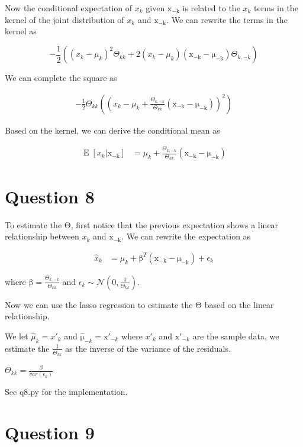 \documentclass{article}
\newcommand{\vect}[1]{\boldsymbol{\mathrm{#1}}}
\DeclareMathOperator{\E}{E}
\begin{document}
Now the conditional expectation of \(x_k\) given \(\vect{x_{-k}}\) is related to the \(x_k\) terms in the kernel of the joint distribution of \(x_k\) and \(\vect{x_{-k}}\). We can rewrite the terms in the kernel as

\[-\frac{1}{2} \left( {(x_k - \mu_k)^2}{\Theta_{kk}} + 2 {(x_k - \mu_k)(\vect{x_{-k}} - \vect{\mu_{-k}})}{\Theta_{k,-k}}   \right)\]

We can complete the square as

\begin{align*}
  -\frac{1}{2} \Theta_{kk}\left( (x_k - \mu_k + \frac{\Theta_{k,-k}}{\Theta_{kk}}(\vect{x_{-k}} - \vect{\mu_{-k}}))^2  \right)
\end{align*}

Based on the kernel, we can derive the conditional mean as 

\begin{align*}
  \E[x_k | \vect{x_{-k}}] &= \mu_k + \frac{\Theta_{k,-k}}{\Theta_{kk}}(\vect{x_{-k}} - \vect{\mu_{-k}})
\end{align*}

\section*{Question 8}
To estimate the \(\vect \Theta\), first notice that the previous expectation shows a linear relationship between \(x_k\) and \(\vect{x_{-k}}\). We can rewrite the expectation as

\begin{align*}
  \hat x_k &= \mu_k + \vect \beta^T(\vect{x_{-k}} - \vect{\mu_{-k}}) + \epsilon_k
\end{align*}

where \(\vect \beta = \frac{\Theta_{k,-k}}{\Theta_{kk}}\) and \(\epsilon_k \sim \mathcal{N}(0, \frac{1}{\Theta_{kk}})\).

Now we can use the lasso regression to estimate the \(\vect \Theta\) based on the linear relationship.

We let \(\hat \mu_k = x'_k\) and \(\hat{\vect{\mu}}_{-k} = \vect x'_{-k}\) where \(x'_k\) and \(\vect x'_{-k}\) are the sample data, we estimate the \(\frac{1}{\Theta_{kk}}\) as the inverse of the variance of the residuals.

\(\Theta_{kk} = \frac{\beta}{var(\epsilon_k)}\)

See q8.py for the implementation.

\section*{Question 9}
\end{document}
